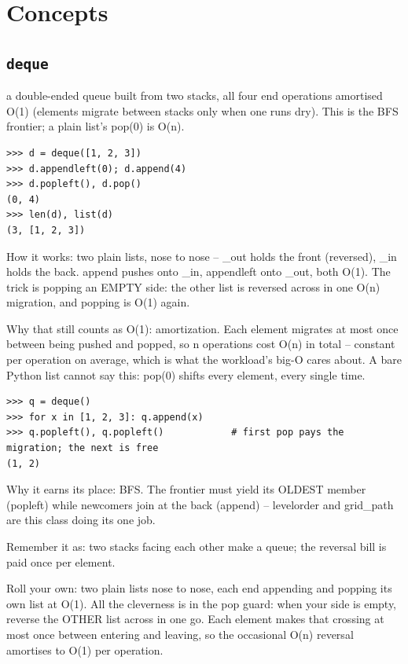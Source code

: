 \documentclass[10pt,letterpaper]{book}
\begin{document}
\section{Concepts}
\subsection{\texttt{deque}}\label{def:deque}
a double-ended queue built from two stacks, all four end operations amortised O(1) (elements migrate between stacks only when one runs dry). This is the BFS frontier; a plain list's pop(0) is O(n).
\begin{lstlisting}[style=ex]
>>> d = deque([1, 2, 3])
>>> d.appendleft(0); d.append(4)
>>> d.popleft(), d.pop()
(0, 4)
>>> len(d), list(d)
(3, [1, 2, 3])
\end{lstlisting}

How it works: two plain lists, nose to nose -- \_out holds the front (reversed), \_in holds the back. append pushes onto \_in, appendleft onto \_out, both O(1). The trick is popping an EMPTY side: the other list is reversed across in one O(n) migration, and popping is O(1) again.


Why that still counts as O(1): amortization. Each element migrates at most once between being pushed and popped, so n operations cost O(n) in total -- constant per operation on average, which is what the workload's big-O cares about. A bare Python list cannot say this: pop(0) shifts every element, every single time.

\begin{lstlisting}[style=ex]
>>> q = deque()
>>> for x in [1, 2, 3]: q.append(x)
>>> q.popleft(), q.popleft()            # first pop pays the migration; the next is free
(1, 2)
\end{lstlisting}

Why it earns its place: BFS. The frontier must yield its OLDEST member (popleft) while newcomers join at the back (append) -- levelorder and grid\_path are this class doing its one job.


Remember it as: two stacks facing each other make a queue; the reversal bill is paid once per element.


Roll your own: two plain lists nose to nose, each end appending and popping its own list at O(1). All the cleverness is in the pop guard: when your side is empty, reverse the OTHER list across in one go. Each element makes that crossing at most once between entering and leaving, so the occasional O(n) reversal amortises to O(1) per operation.
\end{document}
